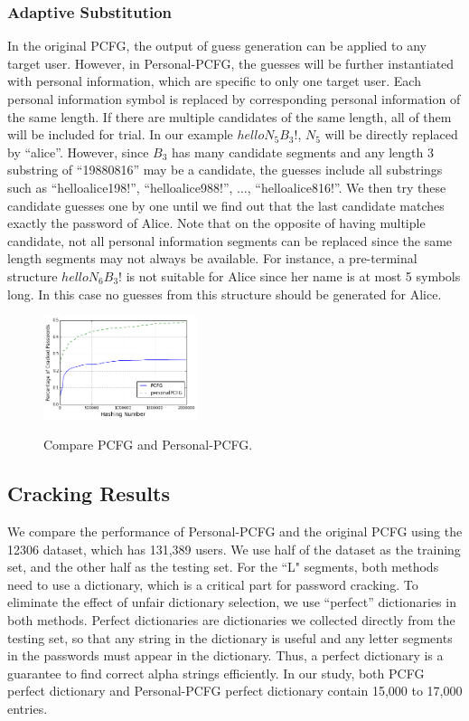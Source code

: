 \subsubsection{Adaptive Substitution}
In the original PCFG, the output of guess generation can be
applied to any target user. However, in Personal-PCFG, the guesses
will be further instantiated with personal information, which are
specific to only one target user.  Each personal information symbol is
replaced by corresponding personal information of the same length. If
there are multiple candidates of the same length, all of them will be
included for trial. In our example $helloN_5B_3!$, $N_5$ will be
directly replaced by ``alice''. However, since $B_3$ has many
candidate segments and any length 3 substring of ``19880816'' may be a
candidate, the guesses include all substrings such as
``helloalice198!'', ``helloalice988!'', $\ldots$,
``helloalice816!''. We then try these candidate guesses one by one
until we find out that the last candidate matches exactly the password
of Alice. Note that on the opposite of having multiple candidate, not
all personal information segments can be replaced since the same
length segments may not always be available. For instance, a
pre-terminal structure $helloN_6B_3!$ is not suitable for Alice since
her name is at most 5 symbols long. In this case no guesses from this
structure should be generated for Alice.

\begin{figure}[t]
  \centering
  \caption{ Compare PCFG and Personal-PCFG.}{}
  \label{f3}
  \includegraphics[width=0.4\textwidth]{fig/cmp}
\vspace{-0.1in}
\end{figure}

\subsection{Cracking Results}
We compare the performance of Personal-PCFG and the
original PCFG using the 12306 dataset, which has 131,389 users.  We 
use half of the dataset as the training set,
and the other half as the testing set.  For the ``L" segments, both
methods need to use a dictionary, which is a critical part for password
cracking. To eliminate the effect of unfair dictionary selection, we
use ``perfect'' dictionaries in both methods. Perfect dictionaries are
dictionaries we collected directly from the testing set, so that any
string in the dictionary is useful and any letter segments in the passwords
must appear in the dictionary. Thus, a perfect dictionary is a
guarantee to find correct alpha strings efficiently. In our study, both PCFG perfect dictionary and Personal-PCFG perfect dictionary contain 15,000 to 17,000 entries.


